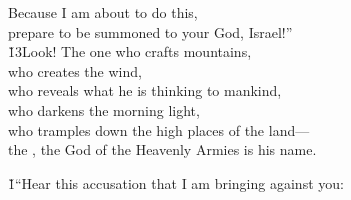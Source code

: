 \begin{poetry}
\poemll    Because I am about to do this, \\
\poemlll       prepare to be summoned to your God, Israel!'' \\
\poeml \v{13}Look! The one who crafts mountains, \\
\poemll    who creates the wind, \\
\poeml who reveals what he is thinking to mankind, \\
\poemll    who darkens the morning light, \\
\poeml who tramples down the high places of the land--- \\
\poemll    the , the God of the Heavenly Armies is his name.
\end{poetry}

\begin{poetry}
\poeml {}
\v{1}``Hear this accusation that I am bringing against you:
\end{poetry}


